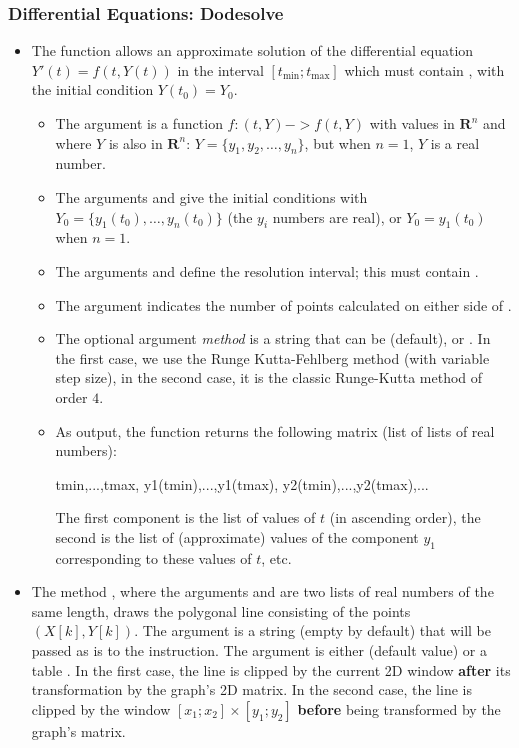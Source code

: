 \subsubsection{Differential Equations: Dodesolve}

\begin{itemize}
    \item The function  allows an approximate solution of the differential equation \(Y'(t)=f(t,Y(t))\) in the interval $[t_{\mathrm{min}};t_{\mathrm{max}}]$ which must contain , with the initial condition $Y(t_0)=Y_0$.

\begin{itemize}
    \item The argument  is a function \(f: (t,Y) -> f(t,Y)\) with values ​​in \(\mathbf R^n\) and where $Y$ is also in \(\mathbf R^n\): $Y=\{y_1,y_2,\ldots, y_n\}$, but when $n=1$, $Y$ is a real number.
    \item The arguments  and  give the initial conditions with $Y_0=\{y_1(t_0), \ldots, y_n(t_0)\}$ (the $y_i$ numbers are real), or $Y_0=y_1(t_0)$ when $n=1$.
    \item The arguments  and  define the resolution interval; this must contain .
    \item The argument  indicates the number of points calculated on either side of .
    \item The optional argument \emph{method} is a string that can be  (default), or . In the first case, we use the Runge Kutta-Fehlberg method (with variable step size), in the second case, it is the classic Runge-Kutta method of order $4$.
    \item As output, the function returns the following matrix (list of lists of real numbers):

\begin{TeXcode}
{ {tmin,...,tmax}, {y1(tmin),...,y1(tmax)}, {y2(tmin),...,y2(tmax)},...}
\end{TeXcode}

The first component is the list of values ​​of $t$ (in ascending order), the second is the list of (approximate) values ​​of the component $y_1$ corresponding to these values ​​of $t$, etc.
\end{itemize}

    \item The method , where the arguments  and  are two lists of real numbers of the same length, draws the polygonal line consisting of the points $(X[k],Y[k])$. The argument  is a string (empty by default) that will be passed as is to the \drawcmd instruction. The argument  is either \nil (default value) or a table . In the first case, the line is clipped by the current 2D window \textbf{after} its transformation by the graph's 2D matrix. In the second case, the line is clipped by the window $[x_1;x_2]\times[y_1;y_2]$ \textbf{before} being transformed by the graph's matrix.


\end{itemize}
